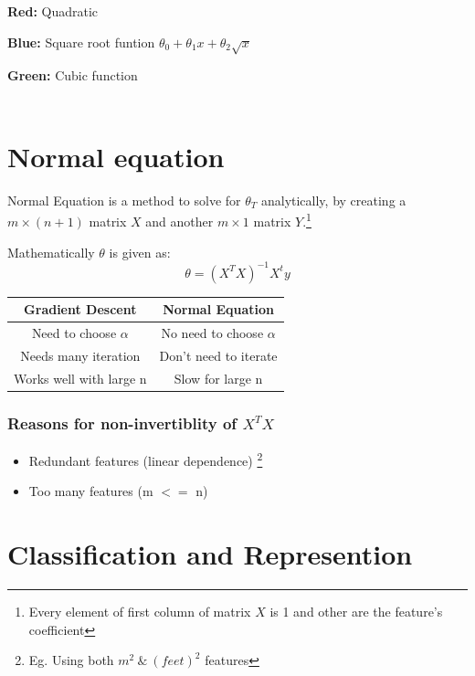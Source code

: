 \documentclass[12pt, A4]{report}
\begin{document}
    \textbf{Red:} Quadratic

    \textbf {Blue:} Square root funtion $ \theta_0+\theta_1x+\theta_2\sqrt{x} $

    \textbf {Green:} Cubic function
\\ \\

\section{Normal equation}
  Normal Equation is a method to solve for $\theta_T$ analytically, by creating a $m\times(n+1)$ matrix $X$ and another $m\times1$ matrix $Y$.\footnote[2]{Every element of first column of matrix $X$ is 1 and other are the feature's coefficient}

  Mathematically $\theta$ is given as:
  \begin{equation} \label {eq: theta}
    \theta = (X^TX)^{-1}X^ty
  \end{equation}

  \begin{tabular}{ |c|c|}
    \hline
    \textbf{Gradient Descent} & \textbf{Normal Equation} \\
    \hline
    Need to choose $\alpha$ & No need to choose $\alpha$ \\
    Needs many iteration & Don't need to iterate \\
    Works well with large n & Slow for large n \\
    \hline
  \end{tabular}

  \vspace{5mm}

  \subsubsection{Reasons for non-invertiblity of $X^T X$}
    \begin{itemize}
        \item Redundant features (linear dependence) \footnote[3]{Eg. Using both $m^2 \  \& \  (feet)^2$ features}
        \item Too many features (m $<=$ n) 
    \end{itemize}

\section{Classification and Represention}
\end{document}
